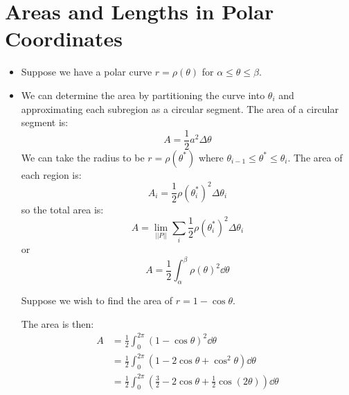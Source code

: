 \section{Areas and Lengths in Polar Coordinates}
\begin{itemize}
    \item Suppose we have a polar curve $r= \rho(\theta)$ for $\alpha \le \theta \le \beta$.
    \item We can determine the area by partitioning the curve into $\theta_i$ and approximating each subregion as a circular segment. The area of a circular segment is:
    \begin{equation}
        A = \frac{1}{2}a^2\Delta \theta
    \end{equation}
    We can take the radius to be $r = \rho(\theta^*)$ where $\theta_{i-1} \le \theta^* \le \theta_i$. The area of each region is:
    \begin{equation}
        A_i = \frac{1}{2}\rho(\theta_i^*)^2 \Delta \theta_i
    \end{equation}
    so the total area is:
    \begin{equation}
        A = \lim_{|| P ||} \sum_{i} \frac{1}{2}\rho(\theta_i^*)^2 \Delta \theta_i
    \end{equation}
    or
    \begin{equation}
        A = \frac{1}{2} \int_\alpha^\beta \rho(\theta)^2 \dd{\theta}
    \end{equation}
    \begin{example}
        Suppose we wish to find the area of $r = 1 - \cos\theta$.
        \begin{center}
        \end{center}
        The area is then:
        \begin{align}
            A &= \frac{1}{2}\int_0^{2\pi} (1-\cos\theta)^2 \dd{\theta} \\ 
            &= \frac{1}{2}\int_0^{2\pi} (1-2\cos\theta+\cos^2\theta)\dd{\theta} \\ 
            &= \frac{1}{2}\int_0^{2\pi} \left(\frac{3}{2}-2\cos\theta + \frac{1}{2}\cos(2\theta)\right) \dd{\theta} \\ 

\end{align}
\end{example}
\end{itemize}
